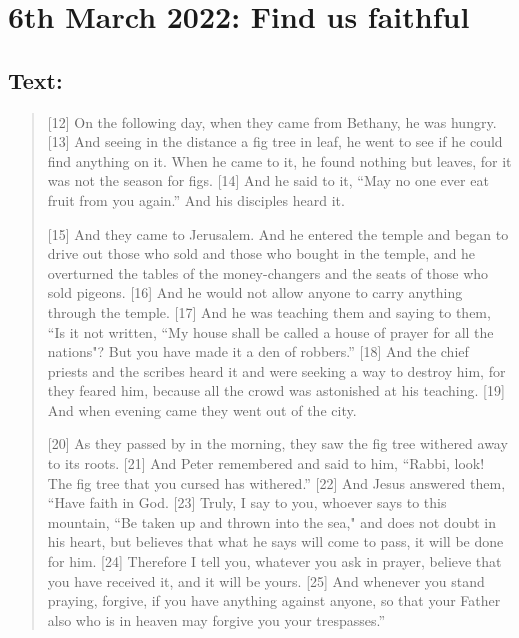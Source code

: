 \section{6th March 2022: Find us faithful}
\subsection*{Text: }
  \begin{quote}
    [12] On the following day, when they came from Bethany, he was hungry.
    [13] And seeing in the distance a fig tree in leaf, he went to see if he
    could find anything on it.  When he came to it, he found nothing but
    leaves, for it was not the season for figs.  [14] And he said to it, “May
    no one ever eat fruit from you again.” And his disciples heard it.

    [15] And they came to Jerusalem.  And he entered the temple and began to
    drive out those who sold and those who bought in the temple, and he
    overturned the tables of the money-changers and the seats of those who
    sold pigeons.  [16] And he would not allow anyone to carry anything
    through the temple.  [17] And he was teaching them and saying to them,
    “Is it not written, ``My house shall be called a house of prayer for all
    the nations"?  But you have made it a den of robbers.” [18] And the chief
    priests and the scribes heard it and were seeking a way to destroy him,
    for they feared him, because all the crowd was astonished at his
    teaching.  [19] And when evening came they went out of the city.

    [20] As they passed by in the morning, they saw the fig tree withered
    away to its roots.  [21] And Peter remembered and said to him, “Rabbi,
    look!  The fig tree that you cursed has withered.” [22] And Jesus
    answered them, “Have faith in God.  [23] Truly, I say to you, whoever
    says to this mountain, ``Be taken up and thrown into the sea," and does
    not doubt in his heart, but believes that what he says will come to pass,
    it will be done for him.  [24] Therefore I tell you, whatever you ask in
    prayer, believe that you have received it, and it will be yours.  [25]
    And whenever you stand praying, forgive, if you have anything against
    anyone, so that your Father also who is in heaven may forgive you your
    trespasses.”
  \end{quote}
